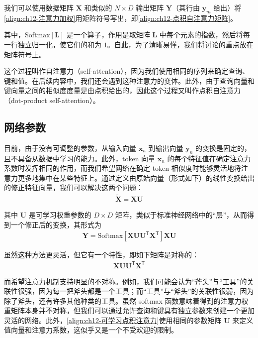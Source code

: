 \documentclass[../../main.tex]{subfiles}
\begin{document}
我们可以使用数据矩阵 $\mathbf{X}$ 和类似的 $N\times D$ 输出矩阵 $\mathbf{Y}$（其行由 $\mathbf{y}_m$ 给出）将\eqref{align:ch12-注意力加权}用矩阵符号写出，即\eqref{align:ch12-点积自注意力矩阵}。

其中，$\mathrm{Softmax}[\mathbf{L}]$ 是一个算子，作用是取矩阵 $\mathbf{L}$ 中每个元素的指数，然后将每一行独立归一化，使它们的和为 $1$。自此，为了清晰易懂，我们将讨论的重点放在矩阵符号上。

这个过程叫作自注意力（self-attention），因为我们使用相同的序列来确定查询、键和值。在后续内容中，我们还会遇到这种注意力的变体。此外，由于查询向量和键向量之间的相似度度量是由点积给出的，因此这个过程又叫作点积自注意力（dot-product self-attention）。

\subsection{网络参数}\label{subsection:ch12-网络参数}

目前，由于没有可调整的参数，从输入向量 $\mathbf{x}_n$ 到输出向量 $\mathbf{y}_n$ 的变换是固定的，且不具备从数据中学习的能力。此外，token 向量 $\mathbf{x}_n$ 的每个特征值在确定注意力系数时发挥相同的作用，而我们希望网络在确定 token 相似度时能够灵活地将注意力更多地集中在某些特征上。通过定义由原始向量（形式如下）的线性变换给出的修正特征向量，我们可以解决这两个问题：
\begin{align}
\tilde{\mathbf{X}}=\mathbf{X}\mathbf{U}
\label{align:ch12-特征线性变换}
\end{align}

其中 $\mathbf{U}$ 是可学习权重参数的 $D\times D$ 矩阵，类似于标准神经网络中的“层”，从而得到一个修正后的变换，其形式为
\begin{align}
\mathbf{Y}=\mathrm{Softmax}\left[\mathbf{X}\mathbf{U}\mathbf{U}^{\mathsf{T}}\mathbf{X}^{\mathsf{T}}\right]\mathbf{X}\mathbf{U}
\label{align:ch12-可学习点积注意力}
\end{align}

虽然这种方法更灵活，但它有一个特性，即如下矩阵是对称的：
\begin{align}
\mathbf{X}\mathbf{U}\mathbf{U}^{\mathsf{T}}\mathbf{X}^{\mathsf{T}}
\label{align:ch12-对称注意力矩阵}
\end{align}

而希望注意力机制支持明显的不对称。例如，我们可能会认为“斧头”与“工具”的关联性很强，因为每一把斧头都是一个工具；而“工具”与“斧头”的关联性很弱，因为除了斧头，还有许多其他种类的工具。虽然 softmax 函数意味着得到的注意力权重矩阵本身并不对称，但我们可以通过允许查询和键具有独立参数来创建一个更加灵活的网络。此外，\eqref{align:ch12-可学习点积注意力}使用相同的参数矩阵 $\mathbf{U}$ 来定义值向量和注意力系数，这似乎又是一个不受欢迎的限制。
\end{document}
